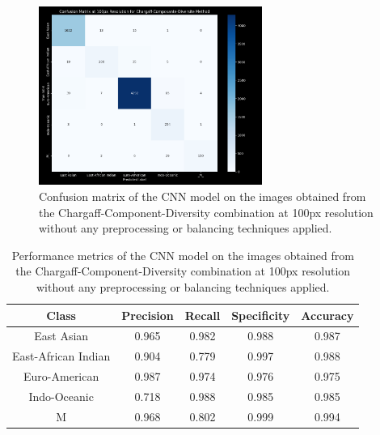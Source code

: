 \begin{figure}[H]
	\centering
	\includegraphics[width=0.65\textwidth]{../imgs/graphs/standard/cnn_confusion_matrix_100px_mask_5_std-old.png}
	\caption{Confusion matrix of the CNN model on the images obtained from the Chargaff-Component-Diversity combination at 100px resolution without any
		preprocessing or balancing techniques applied.}
	\label{fig:cnn_confusion_matrix_100px_std}
\end{figure}

\begin{table}[H]
	\centering
	\begin{tabular}{|c|c|c|c|c|}
		\hline
		\textbf{Class}      & \textbf{Precision} & \textbf{Recall} & \textbf{Specificity} & \textbf{Accuracy} \\
		\hline
		East Asian          & 0.965              & 0.982           & 0.988                & 0.987             \\
		East-African Indian & 0.904              & 0.779           & 0.997                & 0.988             \\
		Euro-American       & 0.987              & 0.974           & 0.976                & 0.975             \\
		Indo-Oceanic        & 0.718              & 0.988           & 0.985                & 0.985             \\
		M                   & 0.968              & 0.802           & 0.999                & 0.994             \\
		\hline
	\end{tabular}
	\caption{Performance metrics of the CNN model on the images obtained from the Chargaff-Component-Diversity combination at 100px resolution without any
		preprocessing or balancing techniques applied.}
	\label{tab:performance_metrics_100px_std}
\end{table}

